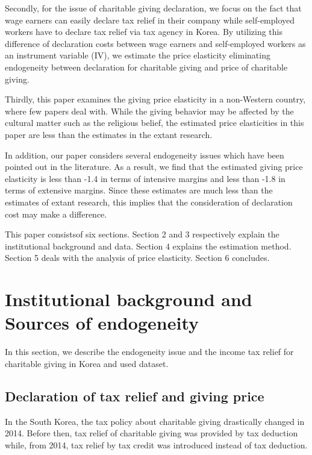 \documentclass[
  11pt,
  a4paper,
]{article}
\begin{document}
Secondly, for the issue of charitable giving declaration, we focus on the fact that wage earners can easily declare tax relief in their company while self-employed workers have to declare tax relief via tax agency in Korea. By utilizing this difference of declaration costs between wage earners and self-employed workers as an instrument variable (IV), we estimate the price elasticity eliminating endogeneity between declaration for charitable giving and price of charitable giving.

Thirdly, this paper examines the giving price elasticity in a non-Western country, where few papers deal with. While the giving behavior may be affected by the cultural matter such as the religious belief, the estimated price elasticities in this paper are less than the estimates in the extant research.

In addition, our paper considers several endogeneity issues which have been pointed out in the literature. As a result, we find that the estimated giving price elasticity is less than -1.4 in terms of intensive margins and less than -1.8 in terms of extensive margins. Since these estimates are much less than the estimates of extant research, this implies that the consideration of declaration cost may make a difference.

This paper consistsof six sections. Section 2 and 3 respectively explain the institutional background and data. Section 4 explains the estimation method. Section 5 deals with the analysis of price elasticity. Section 6 concludes.

\hypertarget{institutional-background-and-sources-of-endogeneity}{%
\section{Institutional background and Sources of endogeneity}\label{institutional-background-and-sources-of-endogeneity}}

In this section, we describe the endogeneity issue and the income tax relief for charitable giving in Korea and used dataset.

\hypertarget{declaration-of-tax-relief-and-giving-price}{%
\subsection{Declaration of tax relief and giving price}\label{declaration-of-tax-relief-and-giving-price}}

In the South Korea, the tax policy about charitable giving drastically changed in 2014. Before then, tax relief of charitable giving was provided by tax deduction while, from 2014, tax relief by tax credit was introduced instead of tax deduction.
\end{document}

